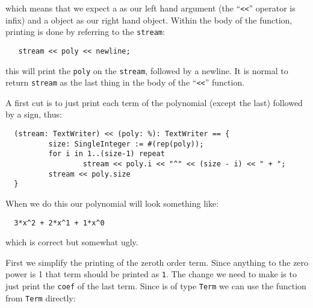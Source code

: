 {\vspace{-1mm}
which means that we expect a 
as our left hand argument (the
``\verb+<<+'' operator is infix) and a 
object as our right hand
object. Within the body of the function, printing is done by referring
to the \verb"stream":

\vspace{-1mm}
\begin{small}
\begin{verbatim}
   stream << poly << newline;
\end{verbatim}
\end{small}

\vspace{-1mm}
this will print the \verb"poly" on the \verb"stream",
followed by a newline.
It is normal to return \verb"stream"
as the last thing in the body of the
``\verb+<<+'' function.

A first cut is to just print each term of the polynomial (except 
the last) followed by a \ttin{+} sign, thus:
\vspace{-1mm}
 
\begin{small}
\begin{verbatim}
  (stream: TextWriter) << (poly: %): TextWriter == {
          size: SingleInteger := #(rep(poly));
          for i in 1..(size-1) repeat 
                  stream << poly.i << "^" << (size - i) << " + ";
          stream << poly.size
  }
\end{verbatim}
\end{small}

\vspace{-1mm}
When we do this our polynomial will look something like:
\vspace{-1mm}

\begin{small}
\begin{verbatim}
  3*x^2 + 2*x^1 + 1*x^0
\end{verbatim}
\end{small}

\vspace{-1mm}
which is correct but somewhat ugly. 
}

First we simplify the printing of the zeroth order term. Since
anything to the zero power is 1 that term should be printed as \verb"1".
The change we need to make is to just print the \verb"coef" of the last
term. Since  is of type \verb"Term" we can use the function
 from \verb"Term" directly:
     
